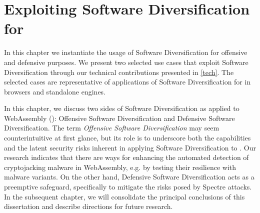 \chapter{Exploiting Software Diversification for \Wasm}
\label{exploit}

In this chapter we instantiate the usage of Software Diversification for offensive and defensive purposes.
We present two selected use cases that exploit Software Diversification through our technical contributions presented in \autoref{tech}.
The selected cases are representative of applications of Software Diversification for \Wasm in browsers and standalone engines.







% 


In this chapter, we discuss two sides of Software Diversification as applied to WebAssembly (\Wasm): Offensive Software Diversification and Defensive Software Diversification.
The term \emph{Offensive Software Diversification} may seem counterintuitive at first glance, but its role is to underscore both the capabilities and the latent security risks inherent in applying Software Diversification to \Wasm.
Our research indicates that there are ways for enhancing the automated detection of cryptojacking malware in WebAssembly, e.g. by testing their resilience with \Wasm malware variants.
On the other hand, Defensive Software Diversification acts as a preemptive safeguard, specifically to mitigate the risks posed by Spectre attacks.
In the subsequent chapter, we will consolidate the principal conclusions of this dissertation and describe directions for future research.